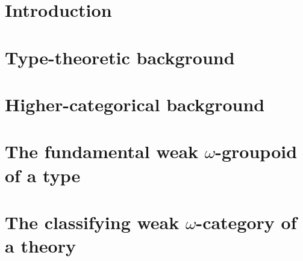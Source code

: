 \documentclass[11pt]{amsbook}
\begin{document}
%
%


\chapter{Introduction}




\mainmatter

\chapter{Type-theoretic background}



\chapter{Higher-categorical background}



\chapter{The fundamental weak \texorpdfstring{$\omega$}{ω}-groupoid of a type} \label{ch:fundamental}



\chapter{The classifying weak \texorpdfstring{$\omega$}{ω}-category of a theory} \label{ch:classifying}






















\backmatter




\end{document}

